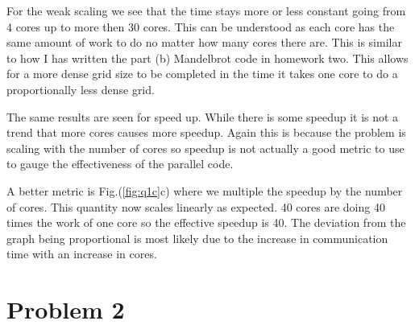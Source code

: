 \documentclass[12pt]{article}
\theoremstyle{plain}
\theoremstyle{definition}
\begin{document}
For the weak scaling we see that the time stays more or less constant going from 4 cores up to more then 30 cores. This can be understood as each core has the same amount of work to do no matter how many cores there are. This is similar to how I has written the part (b) Mandelbrot code in homework two. This allows for a more dense grid size to be completed in the time it takes one core to do a proportionally less dense grid. 

The same results are seen for speed up. While there is some speedup it is not a trend that more cores causes more speedup. Again this is because the problem is scaling with the number of cores so speedup is not actually a good metric to use to gauge the effectiveness of the parallel code.

A better metric is Fig.(\ref{fig:q1c}c) where we multiple the speedup by the number of cores. This quantity now scales linearly as expected. 40 cores are doing 40 times the work of one core so the effective speedup is 40. The deviation from the graph being proportional is most likely due to the increase in communication time with an increase in cores.  


\section{Problem 2}
\end{document}

